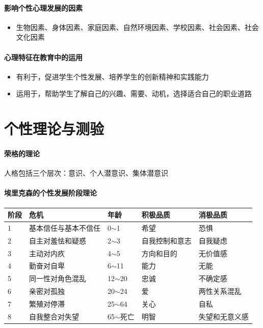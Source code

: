 \documentclass[b5paper,11pt]{article}
\begin{document}
\paragraph{影响个性心理发展的因素}
\begin{itemize}
  \item 生物因素、身体因素、家庭因素、自然环境因素、学校因素、社会因素、社会文化因素
\end{itemize}

\paragraph{心理特征在教育中的运用}
\begin{itemize}
  \item 有利于，促进学生个性发展、培养学生的创新精神和实践能力
  \item 运用于，帮助学生了解自己的兴趣、需要、动机，选择适合自己的职业道路
\end{itemize}

\section{个性理论与测验}
\paragraph{荣格的理论} 人格包括三个层次：意识、个人潜意识、集体潜意识

\paragraph{埃里克森的个性发展阶段理论}
\begin{center}
  \begin{tabular}{@{}lllll@{}}
    \toprule
    阶段 & 危机         & 年龄         & 积极品质    & 消极品质    \\ \midrule
    1  & 基本信任与基本不信任 & 0$\sim$1   & 希望      & 恐惧      \\
    2  & 自主对羞怯和疑惑   & 2$\sim$3   & 自我控制和意志 & 自我疑虑    \\
    3  & 主动对内疚      & 4$\sim$5   & 方向和目的   & 无价值感    \\
    4  & 勤奋对自卑      & 6$\sim$11  & 能力      & 无能      \\
    5  & 同一性对角色混乱   & 12$\sim$20 & 忠诚      & 不确定感    \\
    6  & 亲密对孤独      & 20$\sim$24 & 爱       & 两性关系混乱  \\
    7  & 繁殖对停滞      & 25$\sim$64 & 关心      & 自私      \\
    8  & 自我整合对失望    & 65$\sim$死亡 & 明智      & 失望和无意义感 \\ \bottomrule
  \end{tabular}
\end{center}
\end{document}
